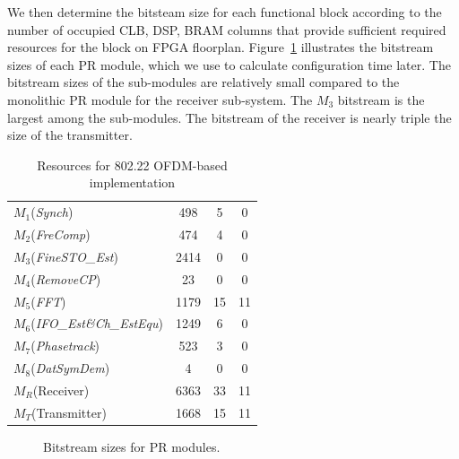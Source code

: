 We then determine the bitsteam size for each functional block according to the number of occupied CLB, DSP, BRAM columns that provide sufficient required resources for the block on FPGA floorplan. %
Figure~\ref{fig:Bitstream} illustrates the bitstream sizes of each PR module, which we use to calculate configuration time later. The bitstream sizes of the sub-modules are relatively small compared to the monolithic PR module for the receiver sub-system. The $M_3$ bitstream is the largest among the sub-modules. The bitstream of the receiver is nearly triple the size of the transmitter.
\begin{table}[hb]
	\centering
	\caption{Resources for 802.22 OFDM-based implementation}
	\label{tab:Resouces}
	\begin{tabular}{l|c|c|c}
        \hline \hline
    			  \makebox[4.2cm][c]{$modules$}	&  \makebox[2cm][c]{Slices}  &   \makebox[2cm][c]{DSP} &   \makebox[2cm][c]{BRAM} \\
	\hline
		$M_1$(\textit{Synch})     				& 498 		& 5	& 0 \\
		$M_2$(\textit{FreComp})				& 474		& 4 	& 0 \\
		$M_3$(\textit{FineSTO\_Est})			& 2414	& 0 	& 0 \\
		$M_4$(\textit{RemoveCP})			& 23  		& 0	& 0 \\
		$M_5$(\textit{FFT})	  			& 1179  	& 15	& 11 \\
		$M_6$(\textit{IFO\_Est\&Ch\_EstEqu})	  	& 1249 	& 6	& 0 \\
		$M_7$(\textit{Phasetrack})	  		& 523  	& 3	& 0 \\
		$M_8$(\textit{DatSymDem})	  		& 4	  	& 0	& 0 \\
		$M_R$(Receiver)  					& 6363  	& 33	& 11 \\
		$M_T$(Transmitter)					& 1668  	& 15	& 11 \\
	\hline \hline
    \end{tabular}
\end{table}

\begin{figure}
\centering
{}
\caption{Bitstream sizes for PR modules.}
\label{fig:Bitstream}
\end{figure}

